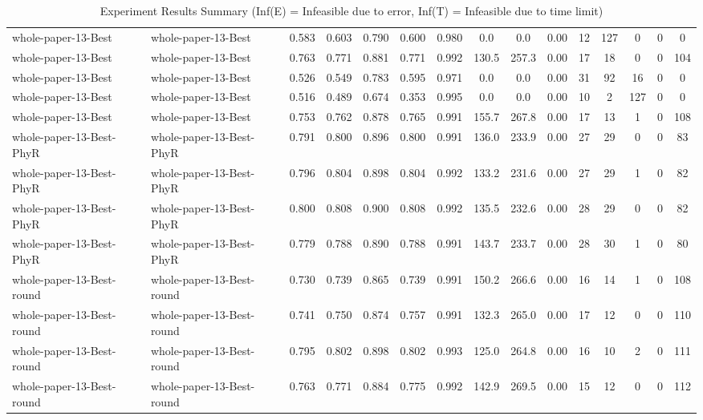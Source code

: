 \begin{table*}[p]
{\begin{tabular}{llccccccccccccc}
      whole-paper-13-Best & whole-paper-13-Best & 0.583 & 0.603 & 0.790 & 0.600 & 0.980 & 0.0 & 0.0 & 0.00 & 12 & 127 & 0 & 0 & 0 \\
      whole-paper-13-Best & whole-paper-13-Best & 0.763 & 0.771 & 0.881 & 0.771 & 0.992 & 130.5 & 257.3 & 0.00 & 17 & 18 & 0 & 0 & 104 \\
      whole-paper-13-Best & whole-paper-13-Best & 0.526 & 0.549 & 0.783 & 0.595 & 0.971 & 0.0 & 0.0 & 0.00 & 31 & 92 & 16 & 0 & 0 \\
      whole-paper-13-Best & whole-paper-13-Best & 0.516 & 0.489 & 0.674 & 0.353 & 0.995 & 0.0 & 0.0 & 0.00 & 10 & 2 & 127 & 0 & 0 \\
      whole-paper-13-Best & whole-paper-13-Best & 0.753 & 0.762 & 0.878 & 0.765 & 0.991 & 155.7 & 267.8 & 0.00 & 17 & 13 & 1 & 0 & 108 \\
      whole-paper-13-Best-PhyR & whole-paper-13-Best-PhyR & 0.791 & 0.800 & 0.896 & 0.800 & 0.991 & 136.0 & 233.9 & 0.00 & 27 & 29 & 0 & 0 & 83 \\
      whole-paper-13-Best-PhyR & whole-paper-13-Best-PhyR & 0.796 & 0.804 & 0.898 & 0.804 & 0.992 & 133.2 & 231.6 & 0.00 & 27 & 29 & 1 & 0 & 82 \\
      whole-paper-13-Best-PhyR & whole-paper-13-Best-PhyR & 0.800 & 0.808 & 0.900 & 0.808 & 0.992 & 135.5 & 232.6 & 0.00 & 28 & 29 & 0 & 0 & 82 \\
      whole-paper-13-Best-PhyR & whole-paper-13-Best-PhyR & 0.779 & 0.788 & 0.890 & 0.788 & 0.991 & 143.7 & 233.7 & 0.00 & 28 & 30 & 1 & 0 & 80 \\
      whole-paper-13-Best-round & whole-paper-13-Best-round & 0.730 & 0.739 & 0.865 & 0.739 & 0.991 & 150.2 & 266.6 & 0.00 & 16 & 14 & 1 & 0 & 108 \\
      whole-paper-13-Best-round & whole-paper-13-Best-round & 0.741 & 0.750 & 0.874 & 0.757 & 0.991 & 132.3 & 265.0 & 0.00 & 17 & 12 & 0 & 0 & 110 \\
      whole-paper-13-Best-round & whole-paper-13-Best-round & 0.795 & 0.802 & 0.898 & 0.802 & 0.993 & 125.0 & 264.8 & 0.00 & 16 & 10 & 2 & 0 & 111 \\
      whole-paper-13-Best-round & whole-paper-13-Best-round & 0.763 & 0.771 & 0.884 & 0.775 & 0.992 & 142.9 & 269.5 & 0.00 & 15 & 12 & 0 & 0 & 112 \\
      \bottomrule
    \end{tabular}%
  }
  \caption{Experiment Results Summary (Inf(E) = Infeasible due to error, Inf(T) = Infeasible due to time limit)}
  \label{tab:experiment-results}
\end{table*}